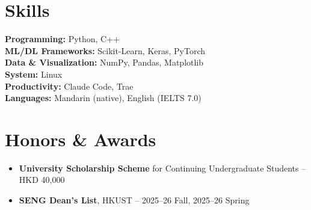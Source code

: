 \documentclass{common/resume}
\begin{document}
\section{Skills}

\textbf{Programming:} Python, C++ \\
\textbf{ML/DL Frameworks:} Scikit-Learn, Keras, PyTorch \\
\textbf{Data \& Visualization:} NumPy, Pandas, Matplotlib \\
\textbf{System:} Linux \\
\textbf{Productivity:} Claude Code, Trae \\
\textbf{Languages:} Mandarin (native), English (IELTS 7.0)

\section{Honors \& Awards}

\begin{itemize}
  \item \textbf{University Scholarship Scheme} for Continuing Undergraduate Students -- HKD 40,000
  \item \textbf{SENG Dean's List}, HKUST -- 2025--26 Fall, 2025--26 Spring
\end{itemize}
\end{document}
